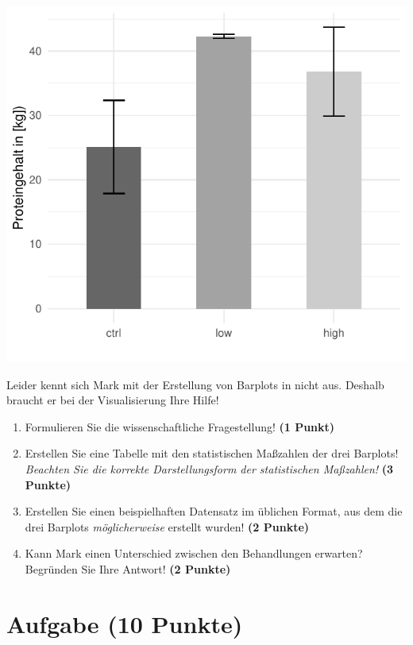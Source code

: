 \documentclass[a4paper, 9pt]{scrartcl}\usepackage[]{graphicx}\usepackage[]{xcolor}
\makeatletter
\def\maxwidth{ %
  \ifdim\Gin@nat@width>\linewidth
    \linewidth
  \else
    \Gin@nat@width
  \fi
}
\makeatother
\begin{document}
{\centering \includegraphics[width=\maxwidth]{img/barplot-02-1} 

}




Leider kennt sich Mark mit der Erstellung von Barplots in \Rlogo nicht aus. Deshalb braucht er bei der Visualisierung Ihre Hilfe!

\begin{enumerate}
\item Formulieren Sie die wissenschaftliche Fragestellung! \textbf{(1 Punkt)}
\item Erstellen Sie eine Tabelle mit den statistischen Maßzahlen der drei Barplots! \textit{Beachten Sie die korrekte Darstellungsform der statistischen Maßzahlen!} \textbf{(3 Punkte)}
\item Erstellen Sie einen beispielhaften Datensatz im \Rlogo üblichen Format, aus dem die drei Barplots \textit{möglicherweise} erstellt wurden! \textbf{(2 Punkte)}
\item Kann Mark einen Unterschied zwischen den Behandlungen erwarten? Begründen Sie Ihre Antwort! \textbf{(2 Punkte)}
\end{enumerate} 
\clearpage

\section{Aufgabe \hfill (10 Punkte)}
\end{document}
